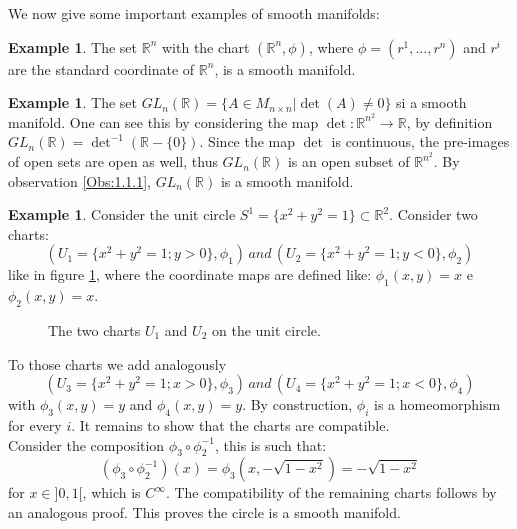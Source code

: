 \documentclass[12pt,a4paper]{report}
\theoremstyle{definition}
\theoremstyle{Theorem}
\theoremstyle{definition}
\newtheorem{Ex}[Def]{Example}
\theoremstyle{definition}
\begin{document}
	We now give some important examples of smooth manifolds:
	\begin{Ex}
		The set $\mathbb{R}^n$ with the chart $(\mathbb{R}^n,\phi)$, where $\phi=(r^1,...,r^n)$ and $r^i$ are the standard coordinate of $\mathbb{R}^n$, is a smooth manifold.
	\end{Ex}
	\begin{Ex}\label{Ex 1.1}
		The set $GL_n(\mathbb{R})=\{A\in M_{n\times n}|\det(A)\neq0\}$ si a smooth manifold. One can see this by considering the map $\det:\mathbb{R}^{n^2}\rightarrow \mathbb{R}$, by definition $GL_n(\mathbb{R})=\det^{-1}(\mathbb{R}-\{0\})$. Since the map $\det$ is continuous, the pre-images of open sets are open as well, thus $GL_n(\mathbb{R})$ is an open subset of $\mathbb{R}^{n^2}$. By observation \ref{Obs:1.1.1}, $GL_n(\mathbb{R})$ is a smooth manifold.
	\end{Ex}
	\begin{Ex}
		Consider the unit circle $S^1=\{x^2+y^2=1\}\subset \mathbb{R}^2$. Consider two charts: $$(U_1=\{x^2+y^2=1;y>0\},\phi_1) \, and \,  (U_2=\{x^2+y^2=1;y<0\},\phi_2)$$ like in figure \ref{figura 1}, where the coordinate maps are defined like: $\phi_1(x,y)=x$ e $\phi_2(x,y)=x$.
		\begin{figure}[H]
			\centering
			\label{figura 1}
			\caption{The two charts $U_1$ and $U_2$ on the unit circle.}
		\end{figure}
		To those charts we add analogously $$(U_3=\{x^2+y^2=1;x>0\},\phi_3)\, and \, (U_4=\{x^2+y^2=1;x<0\},\phi_4)$$ with $\phi_3(x,y)=y$ and $\phi_4(x,y)=y$. By construction, $\phi_i$ is a homeomorphism for every $i$. It remains to show that the charts are compatible.\\
		Consider the composition $\phi_3\circ\phi_2^{-1}$, this is such that: $$(\phi_3\circ\phi_2^{-1})(x)=\phi_3(x,-\sqrt{1-x^2})=-\sqrt{1-x^2}$$ for $x\in ]0,1[$, which is $C^\infty$. The compatibility of the remaining charts follows by an analogous proof. This proves the circle is a smooth manifold.
	\end{Ex}
\end{document}
